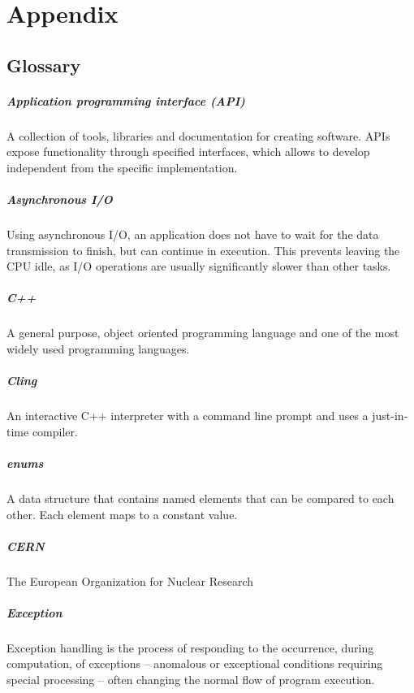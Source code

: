 \chapter{Appendix}
\section{Glossary}
\paragraph{Application programming interface (API)}
A collection of tools, libraries and documentation for creating software. APIs expose functionality through specified interfaces, which allows to develop independent from the specific implementation.
\paragraph{Asynchronous I/O}
Using asynchronous I/O, an application does not have to wait for the data transmission to finish, but can continue in execution. This prevents leaving the CPU idle, as I/O operations are usually significantly slower than other tasks.
\paragraph{C++}
A general purpose, object oriented programming language and one of the most widely used programming languages.

\paragraph{Cling}
An interactive C++ interpreter with a command line prompt and uses a just-in-time compiler.

\paragraph{enums}
A data structure that contains named elements that can be compared to each other. Each element maps to a constant value.

\paragraph{CERN}
The European Organization for Nuclear Research

\paragraph{Exception}
Exception handling is the process of responding to the occurrence, during computation, of exceptions – anomalous or exceptional conditions requiring special processing – often changing the normal flow of program execution.

